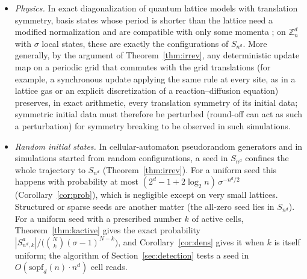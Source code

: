 \documentclass[11pt,a4paper]{article}
\theoremstyle{remark}
\newcommand{\ZZ}{\mathbb{Z}}
\begin{document}
\begin{itemize}[leftmargin=*]
    bulk crystals), so Theorem~\ref{thm:main-enum} counts them, and for binary
    alloys Theorem~\ref{thm:kactive} counts them at fixed composition. A general
    supercell has a quotient of the form $\ZZ_{a}\times\ZZ_{b}\times\ZZ_{c}$
    (Smith normal form), a rectangular torus, whose super-periodic labelings
    Theorem~\ref{thm:abelian} counts (for binary alloys at fixed
    composition, Remark~\ref{rem:abelian}(i)).
    \item \emph{Physics.} In exact diagonalization of quantum lattice models with
    translation symmetry, basis states whose period is shorter than the lattice
    need a modified normalization and are compatible with only some momenta
    \cite[\S\S4.1.3, 4.4.1]{sandvik2010}; on $\ZZ_n^d$ with $\sigma$ local states, these
    are exactly the configurations of $S_{n^d}$. More generally, by the argument
    of Theorem~\ref{thm:irrev}, any deterministic update map on a periodic
    grid that commutes with the grid translations (for example, a synchronous
    update applying the same rule at every site, as in a lattice gas or an
    explicit discretization of a reaction--diffusion equation) preserves, in
    exact arithmetic, every translation symmetry of its initial data; symmetric
    initial data must therefore be perturbed (round-off can act as such a
    perturbation) for symmetry breaking to be observed in such simulations.
    \item \emph{Random initial states.} In cellular-automaton pseudorandom generators
    \cite{wolfram1986} and in simulations started from random configurations, a
    seed in $S_{n^d}$ confines the whole trajectory to $S_{n^d}$
    (Theorem~\ref{thm:irrev}). For a uniform seed this happens with probability
    at most $(2^d-1+2\log_2 n)\,\sigma^{-n^d/2}$ (Corollary~\ref{cor:prob}),
    which is negligible except on very small lattices. Structured or sparse
    seeds are another matter (the all-zero seed lies in $S_{n^d}$). For a
    uniform seed with a prescribed number $k$ of active cells,
    Theorem~\ref{thm:kactive} gives the exact probability
    $|S^a_{n^d,k}|/\bigl(\binom Nk(\sigma-1)^{N-k}\bigr)$, and
    Corollary~\ref{cor:dens} gives it when $k$ is itself uniform; the
    algorithm of Section~\ref{sec:detection} tests a seed in
    $O(\mathrm{sopf}_d(n)\cdot n^d)$ cell reads.
\end{itemize}
\end{document}
